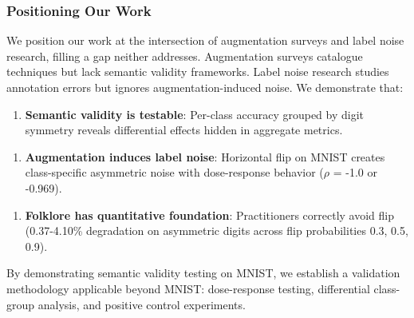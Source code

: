 \subsubsection{Positioning Our Work}

We position our work at the intersection of augmentation surveys and label noise research, filling a gap neither addresses. Augmentation surveys catalogue techniques but lack semantic validity frameworks. Label noise research studies annotation errors but ignores augmentation-induced noise. We demonstrate that:

\begin{enumerate}
\item \textbf{Semantic validity is testable}: Per-class accuracy grouped by digit symmetry reveals differential effects hidden in aggregate metrics.
\end{enumerate}

\begin{enumerate}
\item \textbf{Augmentation induces label noise}: Horizontal flip on MNIST creates class-specific asymmetric noise with dose-response behavior ($\rho$ = -1.0 or -0.969).
\end{enumerate}

\begin{enumerate}
\item \textbf{Folklore has quantitative foundation}: Practitioners correctly avoid flip (0.37-4.10\% degradation on asymmetric digits across flip probabilities {0.3, 0.5, 0.9}).
\end{enumerate}

By demonstrating semantic validity testing on MNIST, we establish a validation methodology applicable beyond MNIST: dose-response testing, differential class-group analysis, and positive control experiments.

